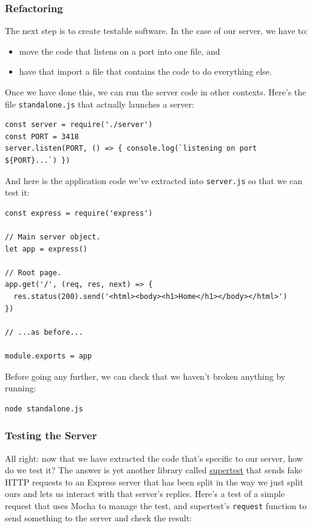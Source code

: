 \subsubsection{Refactoring}\label{s:testing-refactoring}

The next step is to create testable software. In the case of our server,
we have to:

\begin{itemize}
\tightlist
\item
  move the code that listens on a port into one file, and
\item
  have that import a file that contains the code to do everything else.
\end{itemize}

Once we have done this, we can run the server code in other contexts.
Here's the file \texttt{standalone.js} that actually launches a server:

\begin{verbatim}
const server = require('./server')
const PORT = 3418
server.listen(PORT, () => { console.log(`listening on port ${PORT}...`) })
\end{verbatim}

And here is the application code we've extracted into \texttt{server.js}
so that we can test it:

\begin{verbatim}
const express = require('express')

// Main server object.
let app = express()

// Root page.
app.get('/', (req, res, next) => {
  res.status(200).send('<html><body><h1>Home</h1></body></html>')
})

// ...as before...

module.exports = app
\end{verbatim}

Before going any further, we can check that we haven't broken anything
by running:

\begin{verbatim}
node standalone.js
\end{verbatim}

\subsubsection{Testing the Server}\label{s:testing-server}

All right: now that we have extracted the code that's specific to our
server, how do we test it? The answer is yet another library called
\href{https://github.com/visionmedia/supertest}{supertest} that sends
fake HTTP requests to an Express server that has been split in the way
we just split ours and lets us interact with that server's replies.
Here's a test of a simple request that uses Mocha to manage the test,
and supertest's \texttt{request} function to send something to the
server and check the result:

